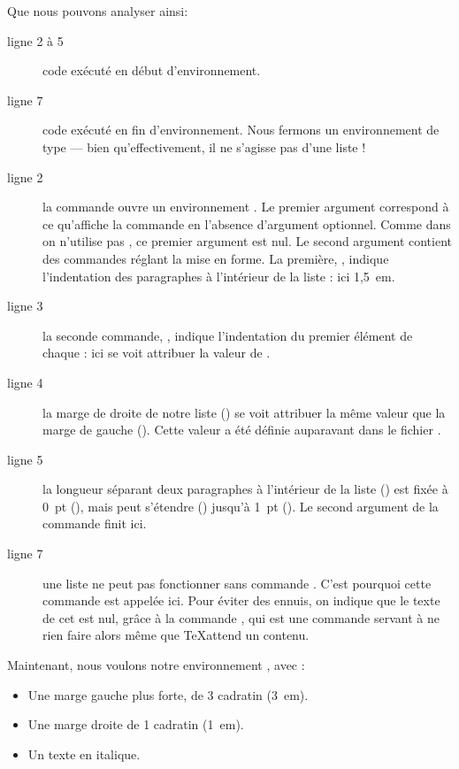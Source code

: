Que nous pouvons analyser ainsi:
\begin{description}
\item[ligne 2 à 5] code exécuté en début d'environnement.
\item[ligne 7] code exécuté en fin d'environnement. Nous fermons un environnement de type  --- bien qu'effectivement, il ne s'agisse pas d'une liste !
\item[ligne 2] la commande  ouvre un environnement . Le premier argument correspond à ce qu'affiche  la commande  en l'absence d'argument optionnel. Comme dans  on n'utilise pas , ce premier argument est nul. Le second argument contient des commandes réglant la mise en forme. La première, , indique l'indentation des paragraphes à l'intérieur de la liste : ici 1,5~em.
\item[ligne 3] la seconde commande, , indique l'indentation du premier élément de chaque : ici  se voit attribuer la valeur de .
\item[ligne 4] la marge de droite de notre liste () se voit attribuer la même valeur que la marge de gauche (). Cette valeur a été définie auparavant dans le fichier .
\item[ligne 5]la longueur séparant deux paragraphes à l'intérieur de la liste () est fixée à 0~pt (), mais peut s'étendre () jusqu'à 1~pt (). Le second argument de la commande  finit ici.
\item[ligne 7]une liste ne peut pas fonctionner sans commande . C'est pourquoi cette commande est appelée ici. Pour éviter des ennuis, on indique que le texte de cet  est nul, grâce à la commande , qui est une commande servant à ne rien faire alors même que \TeX attend un contenu.
\end{description}

Maintenant, nous voulons notre environnement , avec :
\begin{itemize}
\item Une marge gauche plus forte, de 3 cadratin (3~em).
\item Une marge droite de 1 cadratin (1~em).
\item Un texte en italique.
\end{itemize}

